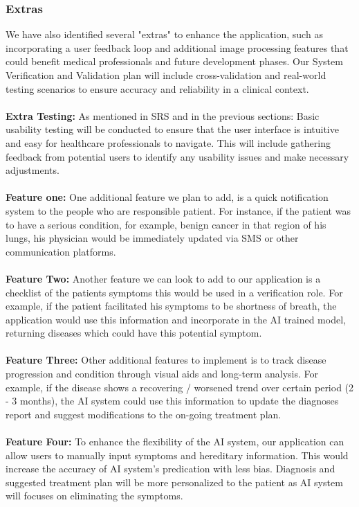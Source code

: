 \documentclass[12pt, titlepage]{article}
\begin{document}
\subsubsection{Extras}
We have also identified several "extras" to enhance the application, such as incorporating a user feedback loop and additional image processing features that could benefit medical professionals and future development phases. Our System Verification and Validation plan will include cross-validation and real-world testing scenarios to ensure accuracy and reliability in a clinical context. \\\\
\textbf{Extra Testing:}
As mentioned in SRS and in the previous sections: Basic usability testing will be conducted to ensure that the user interface is intuitive and easy for healthcare professionals to navigate. This will include gathering feedback from potential users to identify any usability issues and make necessary adjustments. \\\\  
\textbf{Feature one:}
One additional feature we plan to add, is a quick notification system to the people who are responsible patient. For instance, if the patient was to have a serious condition, for example, benign cancer in that region of his lungs, his physician would be immediately updated via SMS or other communication platforms. \\\\  
\textbf{Feature Two:}
Another feature we can look to add to our application is a checklist of the patients symptoms this would be used in a verification role. For example, if the patient facilitated his symptoms to be shortness of breath, the application would use this information and incorporate in the AI trained model, returning diseases which could have this potential symptom.\\\\  
\textbf{Feature Three:}
Other additional features to implement is to track disease progression and condition through visual aids and long-term analysis. For example, if the disease shows a recovering / worsened trend over certain period (2 - 3 months), the AI system could use this information to update the diagnoses report and suggest modifications to the on-going treatment plan. \\\\
\textbf{Feature Four:}
To enhance the flexibility of the AI system, our application can allow users to manually input symptoms and hereditary information. This would increase the accuracy of AI system's predication with less bias. Diagnosis and suggested treatment plan will be more personalized to the patient as AI system will focuses on eliminating the symptoms. \\
\end{document}
